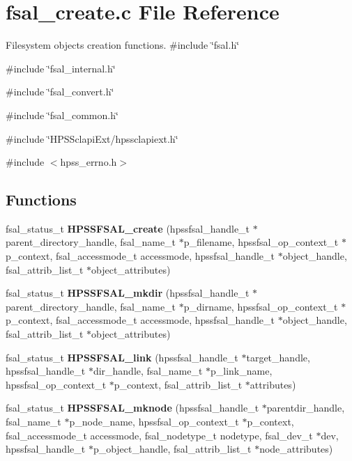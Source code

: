\section{fsal\_\-create.c File Reference}
\label{fsal__create_8c}


Filesystem objects creation functions.  
{\ttfamily \#include \char`\"{}fsal.h\char`\"{}}\par
{\ttfamily \#include \char`\"{}fsal\_\-internal.h\char`\"{}}\par
{\ttfamily \#include \char`\"{}fsal\_\-convert.h\char`\"{}}\par
{\ttfamily \#include \char`\"{}fsal\_\-common.h\char`\"{}}\par
{\ttfamily \#include \char`\"{}HPSSclapiExt/hpssclapiext.h\char`\"{}}\par
{\ttfamily \#include $<$hpss\_\-errno.h$>$}\par
\subsection*{Functions}
\begin{DoxyCompactItemize}
\item 
fsal\_\-status\_\-t {\bf HPSSFSAL\_\-create} (hpssfsal\_\-handle\_\-t $\ast$parent\_\-directory\_\-handle, fsal\_\-name\_\-t $\ast$p\_\-filename, hpssfsal\_\-op\_\-context\_\-t $\ast$p\_\-context, fsal\_\-accessmode\_\-t accessmode, hpssfsal\_\-handle\_\-t $\ast$object\_\-handle, fsal\_\-attrib\_\-list\_\-t $\ast$object\_\-attributes)
\item 
fsal\_\-status\_\-t {\bf HPSSFSAL\_\-mkdir} (hpssfsal\_\-handle\_\-t $\ast$parent\_\-directory\_\-handle, fsal\_\-name\_\-t $\ast$p\_\-dirname, hpssfsal\_\-op\_\-context\_\-t $\ast$p\_\-context, fsal\_\-accessmode\_\-t accessmode, hpssfsal\_\-handle\_\-t $\ast$object\_\-handle, fsal\_\-attrib\_\-list\_\-t $\ast$object\_\-attributes)
\item 
fsal\_\-status\_\-t {\bf HPSSFSAL\_\-link} (hpssfsal\_\-handle\_\-t $\ast$target\_\-handle, hpssfsal\_\-handle\_\-t $\ast$dir\_\-handle, fsal\_\-name\_\-t $\ast$p\_\-link\_\-name, hpssfsal\_\-op\_\-context\_\-t $\ast$p\_\-context, fsal\_\-attrib\_\-list\_\-t $\ast$attributes)
\item 
fsal\_\-status\_\-t {\bf HPSSFSAL\_\-mknode} (hpssfsal\_\-handle\_\-t $\ast$parentdir\_\-handle, fsal\_\-name\_\-t $\ast$p\_\-node\_\-name, hpssfsal\_\-op\_\-context\_\-t $\ast$p\_\-context, fsal\_\-accessmode\_\-t accessmode, fsal\_\-nodetype\_\-t nodetype, fsal\_\-dev\_\-t $\ast$dev, hpssfsal\_\-handle\_\-t $\ast$p\_\-object\_\-handle, fsal\_\-attrib\_\-list\_\-t $\ast$node\_\-attributes)
\end{DoxyCompactItemize}


